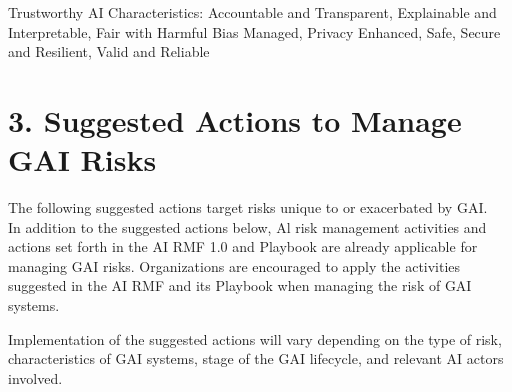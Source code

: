 \documentclass[10pt]{article}
\begin{document}
Trustworthy AI Characteristics: Accountable and Transparent, Explainable and Interpretable, Fair with Harmful Bias Managed, Privacy Enhanced, Safe, Secure and Resilient, Valid and Reliable
\section*{3. Suggested Actions to Manage GAI Risks}
The following suggested actions target risks unique to or exacerbated by GAI.\\
In addition to the suggested actions below, Al risk management activities and actions set forth in the AI RMF 1.0 and Playbook are already applicable for managing GAI risks. Organizations are encouraged to apply the activities suggested in the AI RMF and its Playbook when managing the risk of GAI systems.

Implementation of the suggested actions will vary depending on the type of risk, characteristics of GAI systems, stage of the GAI lifecycle, and relevant AI actors involved.
\end{document}
